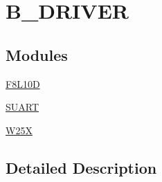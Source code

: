 \hypertarget{group___b___d_r_i_v_e_r}{}\section{B\+\_\+\+D\+R\+I\+V\+ER}
\label{group___b___d_r_i_v_e_r}
\subsection*{Modules}
\begin{DoxyCompactItemize}
\item 
\mbox{\hyperlink{group___f8_l10_d}{F8\+L10D}}
\item 
\mbox{\hyperlink{group___s_u_a_r_t}{S\+U\+A\+RT}}
\item 
\mbox{\hyperlink{group___w25_x}{W25X}}
\end{DoxyCompactItemize}


\subsection{Detailed Description}

